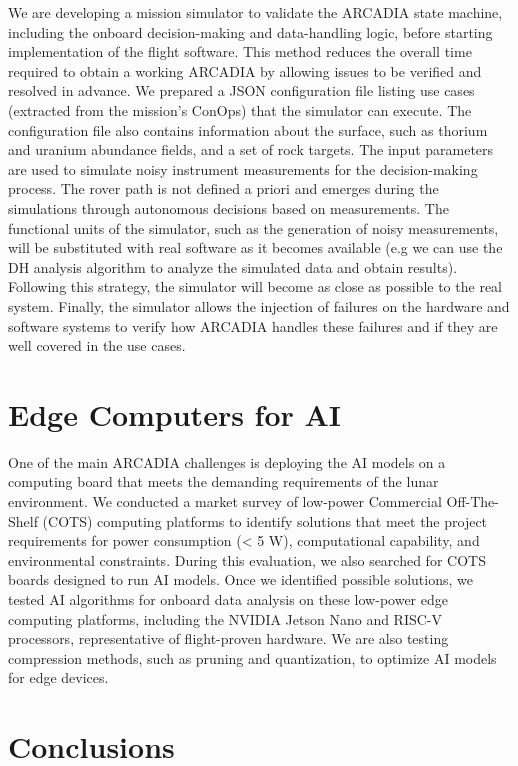 \documentclass[11pt,twoside]{article}
\begin{document}
We are developing a mission simulator to validate the ARCADIA state machine, including the onboard decision-making and data-handling logic, before starting implementation of the flight software. This method reduces the overall time required to obtain a working ARCADIA by allowing issues to be verified and resolved in advance. We prepared a JSON configuration file listing use cases (extracted from the mission's ConOps) that the simulator can execute. The configuration file also contains information about the surface, such as thorium and uranium abundance fields, and a set of rock targets. The input parameters are used to simulate noisy instrument measurements for the decision-making process. The rover path is not defined a priori and emerges during the simulations through autonomous decisions based on measurements. The functional units of the simulator, such as the generation of noisy measurements, will be substituted with real software as it becomes available (e.g we can use the DH analysis algorithm to analyze the simulated data and obtain results). Following this strategy, the simulator will become as close as possible to the real system. Finally, the simulator allows the injection of failures on the hardware and software systems to verify how ARCADIA handles these failures and if they are well covered in the use cases.
 
\section{Edge Computers for AI}

One of the main ARCADIA challenges is deploying the AI models on a computing board that meets the demanding requirements of the lunar environment. We conducted a market survey of low-power Commercial Off-The-Shelf (COTS) computing platforms to identify solutions that meet the project requirements for power consumption (< 5 W), computational capability, and environmental constraints. During this evaluation, we also searched for COTS boards designed to run AI models. Once we identified possible solutions, we tested AI algorithms for onboard data analysis on these low-power edge computing platforms, including the NVIDIA Jetson Nano and RISC-V processors, representative of flight-proven hardware. We are also testing compression methods, such as pruning and quantization, to optimize AI models for edge devices.

\section{Conclusions}
\end{document}
